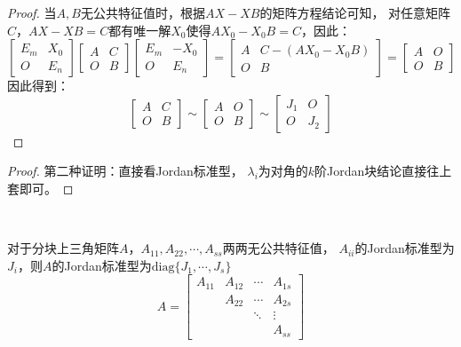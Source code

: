 \begin{proof}
  当$A,B$无公共特征值时，根据$AX - XB$的矩阵方程结论可知，
  对任意矩阵$C$，$AX - XB = C$都有唯一解$X_0$使得$AX_0 - X_0B = C$，因此：
  \begin{equation*}
    \left[
      \begin{array}{cc}
        E_m&X_0\\
        O&E_n
      \end{array}
    \right] \left[
      \begin{array}{cc}
        A&C\\
        O&B
      \end{array}
    \right] \left[
      \begin{array}{cc}
        E_m&-X_0\\
        O&E_n
      \end{array}
    \right] = \left[
      \begin{array}{cc}
        A&C - (AX_0 - X_0B )\\
        O&B
      \end{array}
    \right] = \left[
      \begin{array}{cc}
        A&O\\
        O&B
      \end{array}
    \right]
  \end{equation*}
  因此得到：
  \begin{equation*}
    \left[
      \begin{array}{cc}
        A&C\\
        O&B
      \end{array}
    \right] \sim \left[
      \begin{array}{cc}
        A&O\\
        O&B
      \end{array}
    \right] \sim \left[
      \begin{array}{cc}
        J_1&O\\
        O&J_2
      \end{array}
    \right]
  \end{equation*}
\end{proof}

\begin{proof}
  第二种证明：直接看Jordan标准型，
  $\lambda_i$为对角的$k$阶Jordan块结论直接往上套即可。
\end{proof}

~

\begin{corollary}
  对于分块上三角矩阵$A$，$A_{11},A_{22},\cdots,A_{ss}$两两无公共特征值，
  $A_{ii}$的Jordan标准型为$J_i$，则$A$的Jordan标准型为$\text{diag}\{J_1,\cdots,J_s\}$
  \begin{equation*}
    A = \left[
      \begin{array}{cccc}
        A_{11}&A_{12}&\cdots&A_{1s} \\
              &A_{22}&\cdots&A_{2s} \\
              &&\ddots&\vdots \\
              &&&A_{ss}
      \end{array}
    \right]
  \end{equation*}
\end{corollary}

